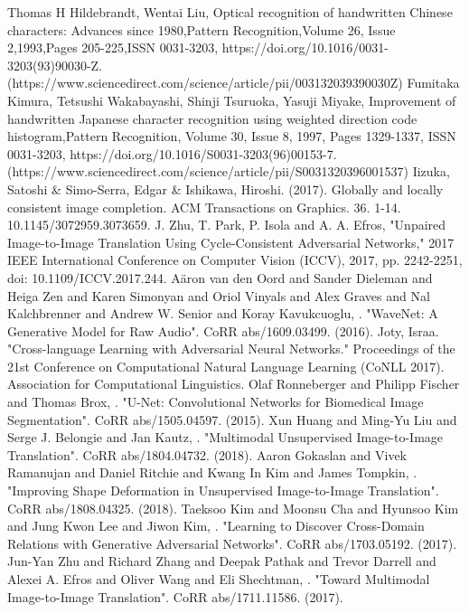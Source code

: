 \documentclass[12pt]{report}
\begin{document}
\begin{thebibliography}{9}
	 Thomas H Hildebrandt, Wentai Liu, Optical recognition of handwritten Chinese characters: Advances since 1980,Pattern Recognition,Volume 26, Issue 2,1993,Pages 205-225,ISSN 0031-3203, https://doi.org/10.1016/0031-3203(93)90030-Z.
(https://www.sciencedirect.com/science/article/pii/003132039390030Z)
	 Fumitaka Kimura, Tetsushi Wakabayashi, Shinji Tsuruoka, Yasuji Miyake, Improvement of handwritten Japanese character recognition using weighted direction code histogram,Pattern Recognition, Volume 30, Issue 8, 1997, Pages 1329-1337, ISSN 0031-3203, https://doi.org/10.1016/S0031-3203(96)00153-7. (https://www.sciencedirect.com/science/article/pii/S0031320396001537)
	 Iizuka, Satoshi \& Simo-Serra, Edgar \& Ishikawa, Hiroshi. (2017). Globally and locally consistent image completion. ACM Transactions on Graphics. 36. 1-14. 10.1145/3072959.3073659. 
	J. Zhu, T. Park, P. Isola and A. A. Efros, "Unpaired Image-to-Image Translation Using Cycle-Consistent Adversarial Networks," 2017 IEEE International Conference on Computer Vision (ICCV), 2017, pp. 2242-2251, doi: 10.1109/ICCV.2017.244.
	 Aäron van den Oord and Sander Dieleman and Heiga Zen and Karen Simonyan and Oriol Vinyals and Alex Graves and Nal Kalchbrenner and Andrew W. Senior and Koray Kavukcuoglu, . "WaveNet: A Generative Model for Raw Audio". CoRR abs/1609.03499. (2016).
	 Joty, Israa. "Cross-language Learning with Adversarial Neural Networks." Proceedings of the 21st Conference on Computational Natural Language Learning (CoNLL 2017). Association for Computational Linguistics.
	 Olaf Ronneberger and Philipp Fischer and Thomas Brox, . "U-Net: Convolutional Networks for Biomedical Image Segmentation". CoRR abs/1505.04597. (2015).
	 Xun Huang and Ming-Yu Liu and Serge J. Belongie and Jan Kautz, . "Multimodal Unsupervised Image-to-Image Translation". CoRR abs/1804.04732. (2018).
	 Aaron Gokaslan and Vivek Ramanujan and Daniel Ritchie and Kwang In Kim and James Tompkin, . "Improving Shape Deformation in Unsupervised Image-to-Image Translation". CoRR abs/1808.04325. (2018).
	 Taeksoo Kim and Moonsu Cha and Hyunsoo Kim and Jung Kwon Lee and Jiwon Kim, . "Learning to Discover Cross-Domain Relations with Generative Adversarial Networks". CoRR abs/1703.05192. (2017).
	 Jun-Yan Zhu and Richard Zhang and Deepak Pathak and Trevor Darrell and Alexei A. Efros and Oliver Wang and Eli Shechtman, . "Toward Multimodal Image-to-Image Translation". CoRR abs/1711.11586. (2017).

\end{thebibliography}
\end{document}
